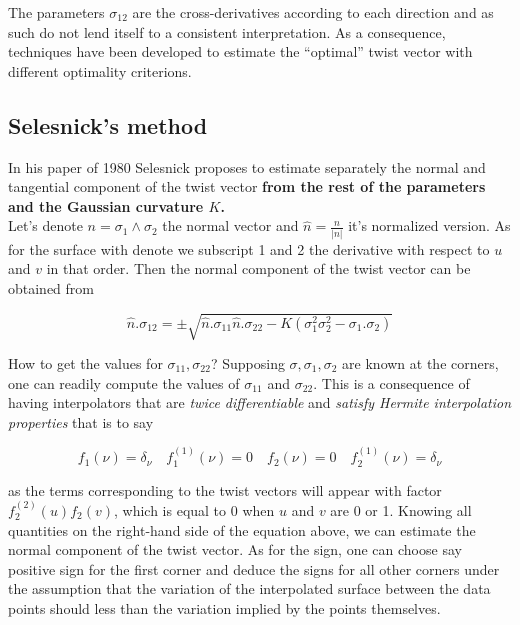 \documentclass[a4paper, 11pt]{article}
\begin{document}
The parameters $\sigma_{12}$ are the cross-derivatives according to each direction and as such do not lend itself to a 
consistent interpretation.  As a consequence, techniques have been developed to estimate the “optimal” twist vector with 
different optimality criterions. 

\subsection{Selesnick's method}

In his paper of 1980 Selesnick proposes to estimate separately the normal and tangential component of the twist vector 
\textbf{from the rest of the parameters and the Gaussian curvature $K$.} \\

Let's denote $n = \sigma_1 \land \sigma_2$ the normal vector and $\hat{n} = \frac{n}{|n|}$ it's normalized version. As 
for the surface with denote we subscript 1 and 2 the derivative with respect to $u$ and $v$ in that order. Then the 
normal component of the twist vector can be obtained from

\begin{equation}
  \hat{n}.\sigma_{12} = \pm \sqrt{\hat{n}.\sigma_{11} \hat{n}.\sigma_{22} - K\left(\sigma_1^2 \sigma_2^2 - 
  \sigma_1.\sigma_2 \right)}
\end{equation}

How to get the values for $\sigma_{11}, \sigma_{22}$? Supposing $\sigma, \sigma_1, \sigma_2$ are known at the corners, 
one can readily compute the values of $\sigma_{11}$ and $\sigma_{22}$. This is a consequence of having interpolators 
that are \emph{twice differentiable} and \emph{satisfy Hermite interpolation properties} that is to say

\begin{equation}
  f_1(\nu) = \delta_{\nu} \quad f_1^{(1)}(\nu) = 0 \quad f_2(\nu) = 0 \quad f_2^{(1)}(\nu) = \delta_{\nu}
\end{equation}

as the terms corresponding to the twist vectors will appear with factor $f_2^{(2)}(u)f_2(v)$, which is equal to 0 when 
$u$ and $v$ are 0 or 1. Knowing all quantities on the right-hand side of the equation above, we can estimate the normal 
component of the twist vector. As for the sign, one can choose say positive sign for the first corner and deduce the 
signs for all other corners under the assumption that the variation of the interpolated surface between the data points 
should less than the variation implied by the points themselves.\\
\end{document}
